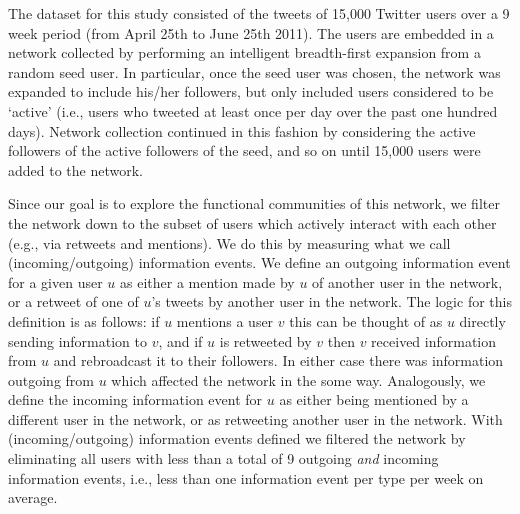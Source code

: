 The dataset for this study consisted of the tweets of 15,000 Twitter users over a 9 week period (from April 25th to June 25th 2011). The users are embedded in a network collected by performing an intelligent breadth-first expansion from a random seed user. In particular, once the seed user was chosen, the network was expanded to include his/her followers, but only included users considered to be `active' (i.e., users who tweeted at least once per day over the past one hundred days). Network collection continued in this fashion by considering the active followers of the active followers of the seed, and so on until 15,000 users were added to the network.

Since our goal is to explore the functional communities of this network, we filter the network down to the subset of users which actively interact with each other (e.g., via retweets and mentions). We do this by measuring what we call (incoming/outgoing) information events. We define an outgoing information event for a given user $u$ as either a mention made by $u$ of another user in the network, or a retweet of one of $u$'s tweets by another user in the network. The logic for this definition is as follows: if $u$ mentions a user $v$ this can be thought of as $u$ directly sending information to $v$, and if $u$ is retweeted by $v$ then $v$ received information from $u$ and rebroadcast it to their followers. In either case there was information outgoing from $u$ which affected the network in the some way. Analogously, we define the incoming information event for $u$ as either being mentioned by a different user in the network, or as retweeting another user in the network.
With (incoming/outgoing) information events defined we filtered the network by eliminating all users with less than a total of 9 outgoing \emph{and} incoming information events, i.e., less than one information event per type per week on average. 
